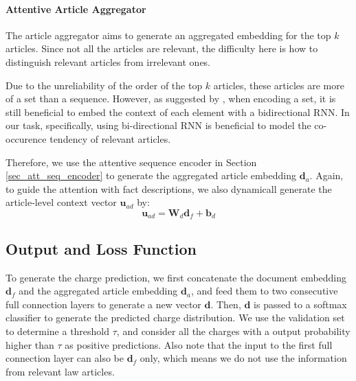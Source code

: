 \paragraph{Attentive Article Aggregator}
The article aggregator aims to generate an aggregated embedding for the top $k$ articles. Since not all the articles are relevant, the difficulty here is how to distinguish relevant articles from irrelevant ones.

Due to the unreliability of the order of the top $k$ articles, these articles are more of a set than a sequence.
However, as suggested by \cite{vinyals2016matching}, when encoding a set, it is still beneficial to embed the context of each element with a bidirectional RNN.
In our task, specifically, using bi-directional RNN is beneficial to model the co-occurence tendency of relevant articles.

Therefore, we use the attentive sequence encoder in Section \ref{sec_att_seq_encoder} to generate the aggregated article embedding $\mathbf{d}_a$. Again, to guide the attention with fact descriptions, we also dynamicall generate the article-level context vector $\mathbf{u}_{ad}$ by:
\begin{equation}
\mathbf{u}_{ad} = \mathbf{W}_d \mathbf{d}_f + \mathbf{b}_d
\end{equation}


\subsection{Output and Loss Function}
To generate the charge prediction, we first concatenate the document embedding $\mathbf{d}_f$ and the aggregated article embedding $\mathbf{d}_a$, and feed them to two consecutive full connection layers to generate a new vector $\mathbf{d}$. Then, $\mathbf{d}$ is passed to a softmax classifier to generate the predicted charge distribution. We use the validation set to determine a threshold $\tau$, and consider all the charges with a output probability higher than $\tau$ as positive predictions.
Also note that the input to the first full connection layer can also be $\mathbf{d}_f$ only, which means we do not use the information from relevant law articles.

